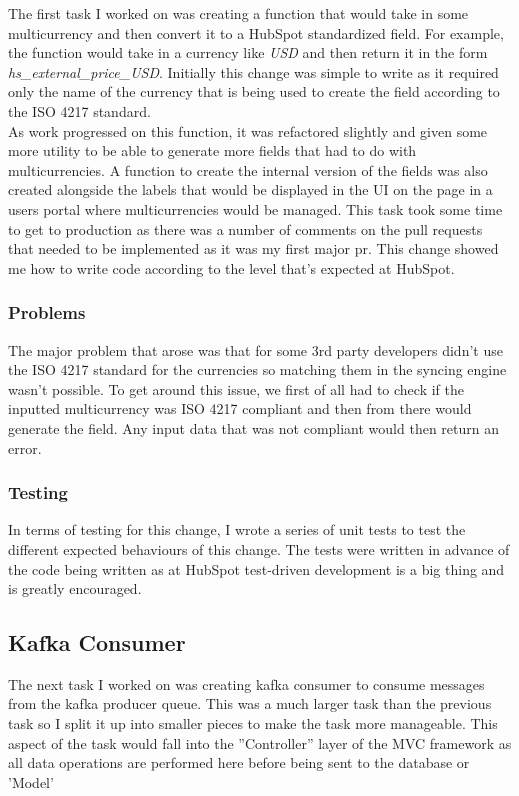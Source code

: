 The first task I worked on was creating a function that would take in some multicurrency and then convert it to a HubSpot standardized field. \newline For example,  the function would take in a currency like \textit{USD} and then return it in the form \textit{hs\_external\_price\_USD}.  \newline Initially this change was simple to write as it required only the name of the currency that is being used to create the field according to the ISO 4217 standard.  \newline \\ As work progressed on this function,  it was refactored slightly and given some more utility to be able to generate more fields that had to do with multicurrencies.  A function to create the internal version of the fields was also created alongside the labels that would be displayed in the UI on the page in a users portal where multicurrencies would be managed.  \newline This task took some time to get to production as there was a number of comments on the pull requests that needed to be implemented as it was my first major pr.  This change showed me how to write code according to the level that's expected at HubSpot.

\subsubsection{Problems} 
The major problem that arose was that for some 3rd party developers didn't use the ISO 4217 standard for the currencies so matching them in the syncing engine wasn't possible.  \newline To get around this issue,  we first of all had to check if the inputted multicurrency was ISO 4217 compliant and then from there would generate the field.  Any input data that was not compliant would then return an error.

\subsubsection{Testing}
In terms of testing for this change,  I wrote a series of unit tests to test the different expected behaviours of this change.  The tests were written in advance of the code being written as at HubSpot test-driven development is a big thing and is greatly encouraged. 

\subsection{Kafka Consumer}
The next task I worked on was creating kafka consumer to consume messages from the kafka producer queue. This was a much larger task than the previous task so I split it up into smaller pieces to make the task more manageable. This aspect of the task would fall into the ''Controller'' layer of the MVC framework as all data operations are performed here before being sent to the database or 'Model'

